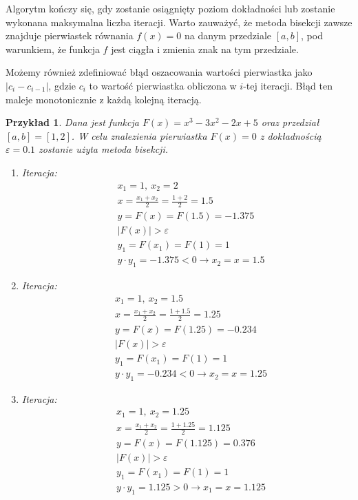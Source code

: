 \documentclass[12pt]{article}
\newtheorem{example}{Przykład}
\begin{document}
Algorytm kończy się, gdy zostanie osiągnięty poziom dokładności lub zostanie wykonana maksymalna liczba iteracji. Warto zauważyć, że metoda bisekcji zawsze znajduje pierwiastek równania $f(x) = 0$ na danym przedziale $[a,b]$, pod warunkiem, że funkcja $f$ jest ciągła i zmienia znak na tym przedziale.

Możemy również zdefiniować błąd oszacowania wartości pierwiastka jako $|c_i - c_{i-1}|$, gdzie $c_i$ to wartość pierwiastka obliczona w $i$-tej iteracji. Błąd ten maleje monotonicznie z każdą kolejną iteracją.

\begin{example}
Dana jest funkcja $F(x) = x^3 - 3x^2 - 2x + 5$ oraz przedział $[a, b] = [1,2]$.
W celu znalezienia pierwiastka $F(x) = 0$ z dokładnością $\varepsilon = 0.1$ zostanie użyta metoda bisekcji.

\begin{enumerate}
    \item Iteracja:\\
    \begin{align*}
        &x_1=1,\ x_2=2\\
        &x=\frac{x_1+x_2}{2}=\frac{1+2}{2}=1.5\\
        &y=F(x)=F(1.5)=-1.375\\
        &|F(x)|>\varepsilon\\
        &y_1=F(x_1)=F(1)=1\\
        &y\cdot y_1=-1.375<0\rightarrow x_2=x=1.5
    \end{align*}
    
    \item Iteracja:\\
    \begin{align*}
        &x_1=1,\ x_2=1.5\\
        &x=\frac{x_1+x_2}{2}=\frac{1+1.5}{2}=1.25\\
        &y=F(x)=F(1.25)=-0.234\\
        &|F(x)|>\varepsilon\\
        &y_1=F(x_1)=F(1)=1\\
        &y\cdot y_1=-0.234<0\rightarrow x_2=x=1.25
    \end{align*}

    
    \item Iteracja:\\
    \begin{align*}
        &x_1=1,\ x_2=1.25\\
        &x=\frac{x_1+x_2}{2}=\frac{1+1.25}{2}=1.125\\
        &y=F(x)=F(1.125)=0.376\\
        &|F(x)|>\varepsilon\\
        &y_1=F(x_1)=F(1)=1\\
        &y\cdot y_1=1.125>0\rightarrow x_1=x=1.125
    \end{align*}
    

\end{enumerate}
\end{example}
\end{document}

